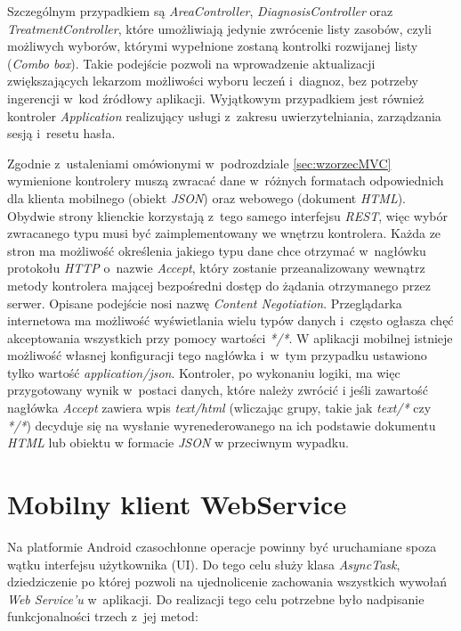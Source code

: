 \documentclass[11pt]{aghdpl}
\begin{document}
Szczególnym przypadkiem są \emph{AreaController}, \emph{DiagnosisController} oraz \emph{TreatmentController}, które umożliwiają jedynie zwrócenie listy zasobów, czyli możliwych wyborów, którymi wypełnione zostaną kontrolki rozwijanej listy (\emph{Combo box}). Takie podejście pozwoli na wprowadzenie aktualizacji zwiększających lekarzom możliwości wyboru leczeń i~diagnoz, bez potrzeby ingerencji w~kod źródłowy aplikacji. Wyjątkowym przypadkiem jest również kontroler \emph{Application} realizujący usługi z~zakresu uwierzytelniania, zarządzania sesją i~resetu hasła.

Zgodnie z~ustaleniami omówionymi w~podrozdziale \ref{sec:wzorzecMVC} wymienione kontrolery muszą zwracać dane w~różnych formatach odpowiednich dla klienta mobilnego (obiekt \emph{JSON}) oraz webowego (dokument \emph{HTML}). Obydwie strony klienckie korzystają z~tego samego interfejsu \emph{REST}, więc wybór zwracanego typu musi być zaimplementowany we wnętrzu kontrolera. Każda ze stron ma możliwość określenia jakiego typu dane chce otrzymać w~nagłówku protokołu \emph{HTTP} o~nazwie \emph{Accept}, który zostanie przeanalizowany wewnątrz metody kontrolera mającej bezpośredni dostęp do żądania otrzymanego przez serwer. Opisane podejście nosi nazwę \emph{Content Negotiation}. Przeglądarka internetowa ma możliwość wyświetlania wielu typów danych i~często ogłasza chęć akceptowania wszystkich przy pomocy wartości \emph{*/*}. W aplikacji mobilnej istnieje możliwość własnej konfiguracji tego nagłówka i~w~tym przypadku ustawiono tylko wartość \emph{application/json}. Kontroler, po wykonaniu logiki, ma więc przygotowany wynik w~postaci danych, które należy zwrócić i jeśli zawartość nagłówka \emph{Accept} zawiera wpis \emph{text/html} (wliczając grupy, takie jak \emph{text/*} czy \emph{*/*}) decyduje się na wysłanie wyrenederowanego na ich podstawie dokumentu \emph{HTML} lub obiektu w formacie \emph{JSON} w przeciwnym wypadku.

\section{Mobilny klient WebService}

Na platformie Android czasochłonne operacje powinny być uruchamiane spoza wątku interfejsu użytkownika (UI). Do tego celu służy klasa \emph{AsyncTask}, dziedziczenie po której pozwoli na ujednolicenie zachowania wszystkich wywołań \emph{Web Service'u} w~aplikacji. Do realizacji tego celu potrzebne było nadpisanie funkcjonalności trzech z~jej metod:
\end{document}
